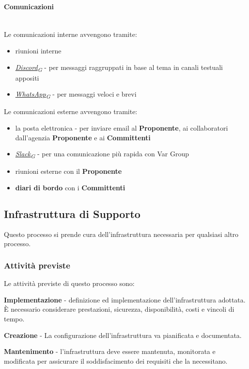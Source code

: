 \documentclass[12pt, a4paper]{article}
\newcommand{\urlglossario}{https://skynetunigroup.github.io/Code_Guardian/Documentazione/RTB/glossario_v1.0.0.pdf} %
\newcommand{\glo}[2]{\href{\urlglossario\#nameddest=#2}{#1\textsubscript{G}}}
\begin{document}
\paragraph{Comunicazioni}\mbox{}\\
Le comunicazioni interne avvengono tramite:

\begin{itemize}
\item
  riunioni interne
\item
  \textit{\glo{Discord}{discord}} - per messaggi raggruppati in base al tema in canali testuali appositi
\item
  \textit{\glo{WhatsApp}{whatsapp}} - per messaggi veloci e brevi
\end{itemize}

Le comunicazioni esterne avvengono tramite:

\begin{itemize}
\item
  la posta elettronica - per inviare email al \textbf{Proponente}, ai collaboratori dall'agenzia \textbf{Proponente} e ai \textbf{Committenti}
\item
  \textit{\glo{Slack}{slack}} - per una comunicazione più rapida con Var Group
\item
  riunioni esterne con il \textbf{Proponente}
\item
  \textbf{diari di bordo} con i \textbf{Committenti}
\end{itemize}


\subsection{Infrastruttura di Supporto}

Questo processo si prende cura dell'infrastruttura necessaria per qualsiasi altro processo.

\subsubsection{Attività previste}

Le attività previste di questo processo sono:

\textbf{Implementazione} - definizione ed implementazione dell'infrastruttura adottata. È necessario considerare prestazioni, sicurezza, disponibilità, costi e vincoli di tempo.

\textbf{Creazione} - La configurazione dell'infrastruttura va pianificata e documentata.

 \textbf{Mantenimento} - l'infrastruttura deve essere mantenuta, monitorata e modificata per assicurare il soddisfacimento dei requisiti che la necessitano.
\end{document}
